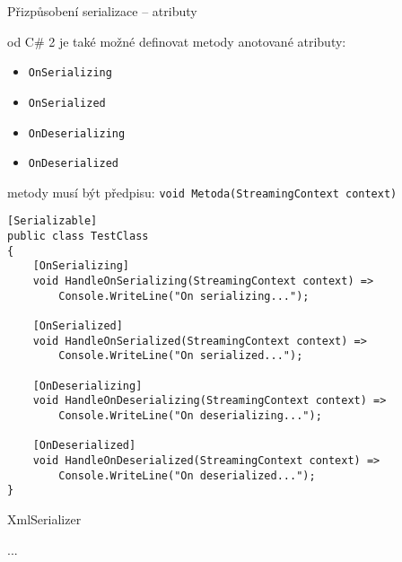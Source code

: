 \begin{frame}[fragile]
\begin{bitemize}{Přizpůsobení serializace -- atributy}
\item od C\# 2 je také možné definovat metody anotované atributy:
\begin{itemize}
\item \lstinline|OnSerializing|
\item \lstinline|OnSerialized|
\item \lstinline|OnDeserializing|
\item \lstinline|OnDeserialized|
\end{itemize}

\item metody musí být předpisu: \lstinline|void Metoda(StreamingContext context)|

\end{bitemize}
\end{frame}




\begin{frame}[fragile]
\begin{yesblock}
\begin{lstlisting}
[Serializable]
public class TestClass
{
    [OnSerializing]
    void HandleOnSerializing(StreamingContext context) => 
        Console.WriteLine("On serializing...");
        
    [OnSerialized]
    void HandleOnSerialized(StreamingContext context) => 
        Console.WriteLine("On serialized...");
        
    [OnDeserializing]
    void HandleOnDeserializing(StreamingContext context) => 
        Console.WriteLine("On deserializing...");
        
    [OnDeserialized]
    void HandleOnDeserialized(StreamingContext context) => 
        Console.WriteLine("On deserialized...");
}
\end{lstlisting}
\end{yesblock}
\end{frame}




\begin{frame}[fragile]
\begin{bitemize}{XmlSerializer}
\item ...
\end{bitemize}
\end{frame}